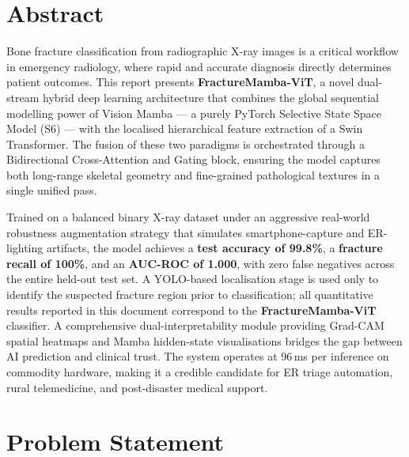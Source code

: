 \documentclass[12pt, a4paper]{article}
\begin{document}
\newpage
\pagecolor{white}
\color{BodyText}
\setcounter{page}{1}

\section{Abstract}

\begin{tcolorbox}[abstractbox]
Bone fracture classification from radiographic X-ray images is a critical workflow in emergency
radiology, where rapid and accurate diagnosis directly determines patient outcomes. This report
presents \textbf{FractureMamba-ViT}, a novel dual-stream hybrid deep learning architecture that
combines the global sequential modelling power of Vision Mamba — a purely PyTorch Selective
State Space Model (S6) — with the localised hierarchical feature extraction of a Swin
Transformer. The fusion of these two paradigms is orchestrated through a Bidirectional
Cross-Attention and Gating block, ensuring the model captures both long-range skeletal geometry
and fine-grained pathological textures in a single unified pass.

Trained on a balanced binary X-ray dataset under an aggressive real-world robustness augmentation
strategy that simulates smartphone-capture and ER-lighting artifacts, the model achieves a
\textbf{test accuracy of 99.8\%}, a \textbf{fracture recall of 100\%}, and an
\textbf{AUC-ROC of 1.000}, with zero false negatives across the entire held-out test set. A
YOLO-based localisation stage is used only to identify the suspected fracture region prior to
classification; all quantitative results reported in this document correspond to the
\textbf{FractureMamba-ViT} classifier. A
comprehensive dual-interpretability module providing Grad-CAM spatial heatmaps and Mamba
hidden-state visualisations bridges the gap between AI prediction and clinical trust. The system
operates at 96\,ms per inference on commodity hardware, making it a credible candidate for ER
triage automation, rural telemedicine, and post-disaster medical support.
\end{tcolorbox}

\section{Problem Statement}
\end{document}
